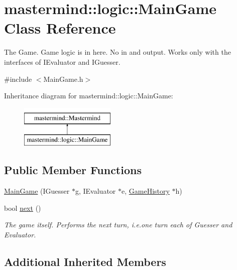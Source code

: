 \hypertarget{classmastermind_1_1logic_1_1_main_game}{}\section{mastermind\+:\+:logic\+:\+:Main\+Game Class Reference}
\label{classmastermind_1_1logic_1_1_main_game}


The Game. Game logic is in here. No in and output. Works only with the interfaces of I\+Evaluator and I\+Guesser.  




{\ttfamily \#include $<$Main\+Game.\+h$>$}

Inheritance diagram for mastermind\+:\+:logic\+:\+:Main\+Game\+:\begin{figure}[H]
\begin{center}
\leavevmode
\includegraphics[height=2.000000cm]{classmastermind_1_1logic_1_1_main_game}
\end{center}
\end{figure}
\subsection*{Public Member Functions}
\begin{DoxyCompactItemize}
\item 
\hyperlink{classmastermind_1_1logic_1_1_main_game_af1a4d71009b1d4322edec911ea39b55c}{Main\+Game} (I\+Guesser $\ast$g, I\+Evaluator $\ast$e, \hyperlink{classmastermind_1_1logic_1_1_game_history}{Game\+History} $\ast$h)
\item 
bool \hyperlink{classmastermind_1_1logic_1_1_main_game_a2b48f18cf8dbd95431d4627b57ea5d01}{next} ()
\begin{DoxyCompactList}\small\item\em The game itself. Performs the next turn, i.\+e.\+one turn each of Guesser and Evaluator. \end{DoxyCompactList}\end{DoxyCompactItemize}
\subsection*{Additional Inherited Members}



